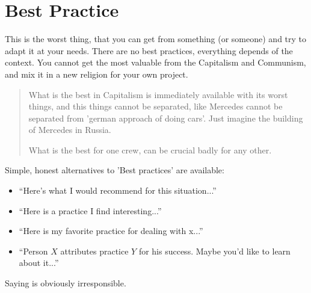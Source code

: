 \section{Best Practice}
\label{sec:Best Practice}


This is the worst thing, that you can get from something (or someone) and try to adapt it at your needs. There are no best practices, everything depends of the context. You cannot get the most valuable from the Capitalism and Communism, and mix it in a new religion for your own project.

\begin{quote}
 

What is the best in Capitalism is immediately available with its worst things, and this things cannot be separated, like Mercedes cannot be separated from 'german approach of doing cars'. Just imagine the building of Mercedes in Russia.

What is the best for one crew, can be crucial badly for any other.
\end{quote}

Simple, honest alternatives to 'Best practices' are available:

\begin{itemize}
 \item     “Here’s what I would recommend for this situation...”
 \item     “Here is a practice I find interesting...”
 \item     “Here is my favorite practice for dealing with {x}...”
 \item     “{Person $X$} attributes {practice $Y$} for his success. Maybe you’d like to learn about it...”
\end{itemize}

Saying  is obviously irresponsible.
